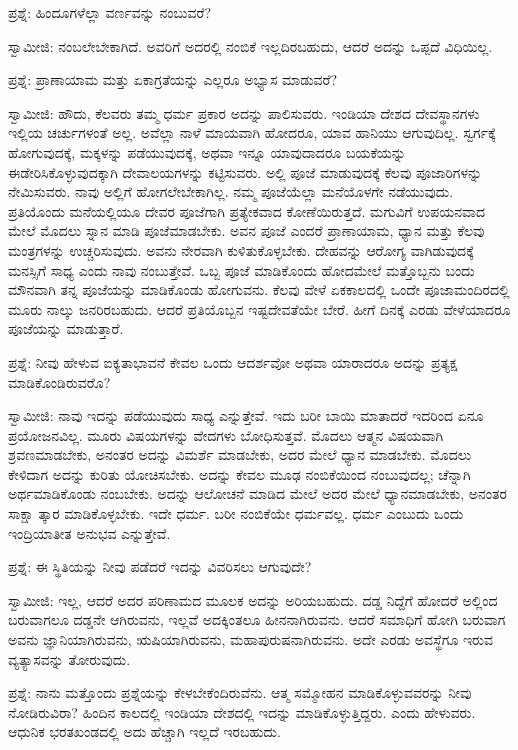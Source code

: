 ಪ್ರಶ್ನೆ: ಹಿಂದೂಗಳೆಲ್ಲಾ ವರ್ಣವನ್ನು ನಂಬುವರೆ?

ಸ್ವಾಮೀಜಿ: ನಂಬಲೇಬೇಕಾಗಿದೆ. ಅವರಿಗೆ ಅದರಲ್ಲಿ ನಂಬಿಕೆ ಇಲ್ಲದಿರಬಹುದು, ಆದರೆ ಅದನ್ನು ಒಪ್ಪದೆ ವಿಧಿಯಿಲ್ಲ.

ಪ್ರಶ್ನೆ: ಪ್ರಾಣಾಯಾಮ ಮತ್ತು ಏಕಾಗ್ರತೆಯನ್ನು ಎಲ್ಲರೂ ಅಭ್ಯಾಸ ಮಾಡುವರೆ?

ಸ್ವಾಮೀಜಿ: ಹೌದು, ಕೆಲವರು ತಮ್ಮ ಧರ್ಮ ಪ್ರಕಾರ ಅದನ್ನು ಪಾಲಿಸುವರು. ಇಂಡಿಯಾ ದೇಶದ ದೇವಸ್ಥಾನಗಳು ಇಲ್ಲಿಯ ಚರ್ಚುಗಳಂತೆ ಅಲ್ಲ. ಅವೆಲ್ಲಾ ನಾಳೆ ಮಾಯವಾಗಿ ಹೋದರೂ, ಯಾವ ಹಾನಿಯು ಆಗುವುದಿಲ್ಲ. ಸ್ವರ್ಗಕ್ಕೆ ಹೋಗುವುದಕ್ಕೆ, ಮಕ್ಕಳನ್ನು ಪಡೆಯುವುದಕ್ಕೆ, ಅಥವಾ ಇನ್ನೂ ಯಾವುದಾದರೂ ಬಯಕೆಯನ್ನು ಈಡೇರಿಸಿಕೊಳ್ಳುವುದಕ್ಕಾಗಿ ದೇವಾಲಯಗಳನ್ನು ಕಟ್ಟಿಸುವರು. ಅಲ್ಲಿ ಪೂಜೆ ಮಾಡುವುದಕ್ಕೆ ಕೆಲವು ಪೂಜಾರಿಗಳನ್ನು ನೇಮಿಸುವರು. ನಾವು ಅಲ್ಲಿಗೆ ಹೋಗಲೇಬೇಕಾಗಿಲ್ಲ. ನಮ್ಮ ಪೂಜೆಯೆಲ್ಲಾ ಮನೆಯೊಳಗೇ ನಡೆಯುವುದು. ಪ್ರತಿಯೊಂದು ಮನೆಯಲ್ಲಿಯೂ ದೇವರ ಪೂಜೆಗಾಗಿ ಪ್ರತ್ಯೇಕವಾದ ಕೋಣೆಯಿರುತ್ತದೆ. ಮಗುವಿಗೆ ಉಪಯನವಾದ ಮೇಲೆ ಮೊದಲು ಸ್ನಾನ ಮಾಡಿ ಪೂಜೆಮಾಡಬೇಕು. ಅವನ ಪೂಜೆ ಎಂದರೆ ಪ್ರಾಣಾಯಾಮ, ಧ್ಯಾನ ಮತ್ತು ಕೆಲವು ಮಂತ್ರಗಳನ್ನು ಉಚ್ಚರಿಸುವುದು. ಅವನು ನೇರವಾಗಿ ಕುಳಿತುಕೊಳ್ಳಬೇಕು. ದೇಹವನ್ನು ಆರೋಗ್ಯ ವಾಗಿಡುವುದಕ್ಕೆ ಮನಸ್ಸಿಗೆ ಸಾಧ್ಯ ಎಂದು ನಾವು ನಂಬುತ್ತೇವೆ. ಒಬ್ಬ ಪೂಜೆ ಮಾಡಿಕೊಂದು ಹೋದಮೇಲೆ ಮತ್ತೊಬ್ಬನು ಬಂದು ಮೌನವಾಗಿ ತನ್ನ ಪೂಜೆಯನ್ನು ಮಾಡಿಕೊಂಡು ಹೋಗುವನು. ಕೆಲವು ವೇಳೆ ಏಕಕಾಲದಲ್ಲಿ ಒಂದೇ ಪೂಜಾಮಂದಿರದಲ್ಲಿ ಮೂರು ನಾಲ್ಕು ಜನರಿರಬಹುದು. ಆದರೆ ಪ್ರತಿಯೊಬ್ಬನ ಇಷ್ಟದೇವತೆಯೇ ಬೇರೆ. ಹೀಗೆ ದಿನಕ್ಕೆ ಎರಡು ವೇಳೆಯಾದರೂ ಪೂಜೆಯನ್ನು ಮಾಡುತ್ತಾರೆ.

ಪ್ರಶ್ನೆ: ನೀವು ಹೇಳುವ ಐಕ್ಯತಾಭಾವನೆ ಕೇವಲ ಒಂದು ಆದರ್ಶವೋ ಅಥವಾ ಯಾರಾದರೂ ಅದನ್ನು ಪ್ರತ್ಯಕ್ಷ ಮಾಡಿಕೊಂಡಿರುವರೊ?

ಸ್ವಾಮೀಜಿ: ನಾವು ಇದನ್ನು ಪಡೆಯುವುದು ಸಾಧ್ಯ ಎನ್ನುತ್ತೇವೆ. ಇದು ಬರೀ ಬಾಯಿ ಮಾತಾದರೆ ಇದರಿಂದ ಏನೂ ಪ್ರಯೋಜನವಿಲ್ಲ. ಮೂರು ವಿಷಯಗಳನ್ನು ವೇದಗಳು ಬೋಧಿಸುತ್ತವೆ. ಮೊದಲು ಆತ್ಮನ ವಿಷಯವಾಗಿ ಶ್ರವಣಮಾಡಬೇಕು, ಅನಂತರ ಅದನ್ನು ವಿಮರ್ಶೆ ಮಾಡಬೇಕು, ಅದರ ಮೇಲೆ ಧ್ಯಾನ ಮಾಡಬೇಕು. ಮೊದಲು ಕೇಳಿದಾಗ ಅದನ್ನು ಕುರಿತು ಯೋಚಿಸಬೇಕು. ಅದನ್ನು ಕೇವಲ ಮೂಢ ನಂಬಿಕೆಯಿಂದ ನಂಬುವುದಲ್ಲ; ಚೆನ್ನಾಗಿ ಅರ್ಥಮಾಡಿಕೊಂಡು ನಂಬಬೇಕು. ಅದನ್ನು ಆಲೋಚನೆ ಮಾಡಿದ ಮೇಲೆ ಅದರ ಮೇಲೆ ಧ್ಯಾನಮಾಡಬೇಕು, ಅನಂತರ ಸಾಕ್ಷಾ ತ್ಕಾರ ಮಾಡಿಕೊಳ್ಳಬೇಕು. ಇದೇ ಧರ್ಮ. ಬರೀ ನಂಬಿಕೆಯೇ ಧರ್ಮವಲ್ಲ. ಧರ್ಮ ಎಂಬುದು ಒಂದು ಇಂದ್ರಿಯಾತೀತ ಅನುಭವ ಎನ್ನುತ್ತೇವೆ.

ಪ್ರಶ್ನೆ: ಈ ಸ್ಥಿತಿಯನ್ನು ನೀವು ಪಡೆದರೆ ಇದನ್ನು ವಿವರಿಸಲು ಆಗುವುದೇ?

ಸ್ವಾಮೀಜಿ: ಇಲ್ಲ, ಆದರೆ ಅದರ ಪರಿಣಾಮದ ಮೂಲಕ ಅದನ್ನು ಅರಿಯಬಹುದು. ದಡ್ಡ ನಿದ್ದೆಗೆ ಹೋದರೆ ಅಲ್ಲಿಂದ ಬರುವಾಗಲೂ ದಡ್ಡನೇ ಆಗಿರುವನು, ಇಲ್ಲವೆ ಅದಕ್ಕಿಂತಲೂ ಹೀನನಾಗಿರುವನು. ಆದರೆ ಸಮಾಧಿಗೆ ಹೋಗಿ ಬರುವಾಗ ಅವನು ಜ್ಞಾನಿಯಾಗಿರುವನು, ಋಷಿಯಾಗಿರುವನು, ಮಹಾಪುರುಷನಾಗಿರುವನು. ಅದೇ ಎರಡು ಅವಸ್ಥೆಗೂ ಇರುವ ವ್ಯತ್ಯಾಸವನ್ನು ತೋರುವುದು.

ಪ್ರಶ್ನೆ: ನಾನು ಮತ್ತೊಂದು ಪ್ರಶ್ನೆಯನ್ನು ಕೇಳಬೇಕೆಂದಿರುವೆನು. ಆತ್ಮ ಸಮ್ಮೋಹನ  ಮಾಡಿಕೊಳ್ಳುವವರನ್ನು ನೀವು ನೋಡಿರುವಿರಾ? ಹಿಂದಿನ ಕಾಲದಲ್ಲಿ ಇಂಡಿಯಾ ದೇಶದಲ್ಲಿ ಇದನ್ನು ಮಾಡಿಕೊಳ್ಳುತ್ತಿದ್ದರು. ಎಂದು ಹೇಳುವರು. ಆಧುನಿಕ ಭರತಖಂಡದಲ್ಲಿ ಅದು ಹೆಚ್ಚಾಗಿ ಇಲ್ಲದೆ ಇರಬಹುದು.


